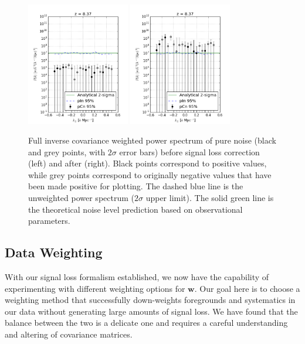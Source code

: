 \documentclass[preprint2,numberedappendix,tighten,twocolappendix]{aastex6}  %
\begin{document}
\begin{figure}
	\centering
	\includegraphics[width=0.4\textwidth]{plots/ps2_noise_nosigloss.png}
	\includegraphics[width=0.4\textwidth]{plots/ps2_noise.png}
	\caption{Full inverse covariance weighted power spectrum of pure noise (black and grey points, with $2\sigma$ error bars) before signal loss correction (left) and after (right). Black points correspond to positive values, while grey points correspond to originally negative values that have been made positive for plotting. The dashed blue line is the unweighted power spectrum ($2\sigma$ upper limit). The solid green line is the theoretical noise level prediction based on observational parameters.}
	\label{fig:ps2_noise}
\end{figure}

\subsection{Data Weighting}
\label{sec:Weight}

With our signal loss formalism established, we now have the capability of experimenting with different weighting options for $\textbf{w}$. Our goal here is to choose a weighting method that successfully down-weights foregrounds and systematics in our data without generating large amounts of signal loss. We have found that the balance between the two is a delicate one and requires a careful understanding and altering of covariance matrices.
\end{document}
